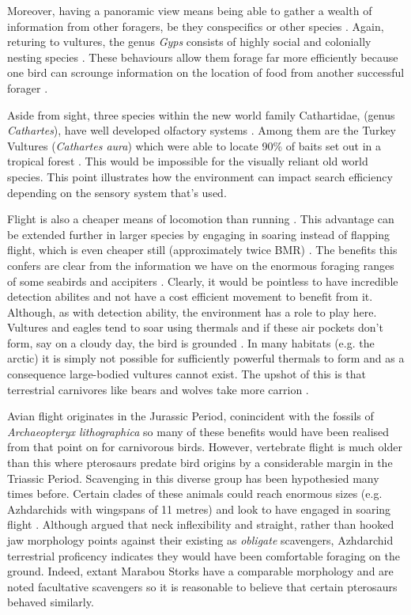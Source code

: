 \documentclass[a4paper,12pt]{article}
\begin{document}
Moreover, having a panoramic view means being able to gather a wealth of information from other foragers, be they conspecifics or other species \citep{jackson2008effect}. Again, returing to vultures, the genus \textit{Gyps} consists of highly social and colonially nesting species \citep{fernandez2015density}. These behaviours allow them forage far more efficiently because one bird can scrounge information on the location of food from another successful forager \citep{KaneVul}. 

Aside from sight, three species within the new world family Cathartidae, (genus \textit{Cathartes}), have well developed olfactory systems \citep{AR:AR22815}. Among them are the Turkey Vultures (\textit{Cathartes aura}) which were able to locate 90\% of baits set out in a tropical forest \citep{houston1986olfaction}. This would be impossible for the visually reliant old world species. This point illustrates how the environment can impact search efficiency depending on the sensory system that's used. 

Flight is also a cheaper means of locomotion than running \citep{tucker1975energetic}. This advantage can be extended further in larger species by engaging in soaring instead of flapping flight, which is even cheaper still (approximately twice BMR) \citep{hedenstrom1993migration}. The benefits this confers are clear from the information we have on the enormous foraging ranges of some seabirds and accipiters \citep{bamford2007ranging}. Clearly, it would be pointless to have incredible detection abilites and not have a cost efficient movement to benefit from it. Although, as with detection ability, the environment has a role to play here. Vultures and eagles tend to soar using thermals and if these air pockets don't form, say on a cloudy day, the bird is grounded \citep{mundy1992vultures}. In many habitats (e.g. the arctic) it is simply not possible for sufficiently powerful thermals to form and as a consequence large-bodied vultures cannot exist. The upshot of this is that terrestrial carnivores like bears and wolves take more carrion \citep{devault2003scavenging}. 

Avian flight originates in the Jurassic Period, conincident with the fossils of \textit{Archaeopteryx lithographica} so many of these benefits would have been realised from that point on for carnivorous birds. However, vertebrate flight is much older than this where pterosaurs predate bird origins by a considerable margin in the Triassic Period. Scavenging in this diverse group has been hypothesied many times before. Certain clades of these animals could reach enormous sizes (e.g. Azhdarchids with wingspans of 11 metres) and look to have engaged in soaring flight \citep{witton2010size}.  Although \cite{witton2008reappraisal} argued that neck inflexibility and straight, rather than hooked jaw morphology points against their existing as \textit{obligate} scavengers, Azhdarchid terrestrial proficency indicates they would have been comfortable foraging on the ground. Indeed, extant Marabou Storks have a comparable morphology and are noted facultative scavengers so it is reasonable to believe that certain pterosaurs behaved similarly.   
\end{document}

